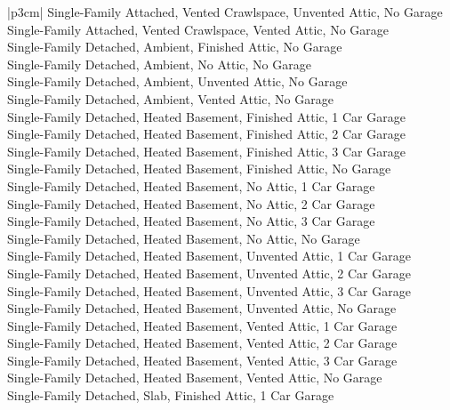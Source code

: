 \begin{customLongTable}{ |p{3cm}| }
Single-Family Attached, Vented Crawlspace, Unvented Attic, No Garage \\ \hline
Single-Family Attached, Vented Crawlspace, Vented Attic, No Garage \\ \hline
Single-Family Detached, Ambient, Finished Attic, No Garage \\ \hline
Single-Family Detached, Ambient, No Attic, No Garage \\ \hline
Single-Family Detached, Ambient, Unvented Attic, No Garage \\ \hline
Single-Family Detached, Ambient, Vented Attic, No Garage \\ \hline
Single-Family Detached, Heated Basement, Finished Attic, 1 Car Garage \\ \hline
Single-Family Detached, Heated Basement, Finished Attic, 2 Car Garage \\ \hline
Single-Family Detached, Heated Basement, Finished Attic, 3 Car Garage \\ \hline
Single-Family Detached, Heated Basement, Finished Attic, No Garage \\ \hline
Single-Family Detached, Heated Basement, No Attic, 1 Car Garage \\ \hline
Single-Family Detached, Heated Basement, No Attic, 2 Car Garage \\ \hline
Single-Family Detached, Heated Basement, No Attic, 3 Car Garage \\ \hline
Single-Family Detached, Heated Basement, No Attic, No Garage \\ \hline
Single-Family Detached, Heated Basement, Unvented Attic, 1 Car Garage \\ \hline
Single-Family Detached, Heated Basement, Unvented Attic, 2 Car Garage \\ \hline
Single-Family Detached, Heated Basement, Unvented Attic, 3 Car Garage \\ \hline
Single-Family Detached, Heated Basement, Unvented Attic, No Garage \\ \hline
Single-Family Detached, Heated Basement, Vented Attic, 1 Car Garage \\ \hline
Single-Family Detached, Heated Basement, Vented Attic, 2 Car Garage \\ \hline
Single-Family Detached, Heated Basement, Vented Attic, 3 Car Garage \\ \hline
Single-Family Detached, Heated Basement, Vented Attic, No Garage \\ \hline
Single-Family Detached, Slab, Finished Attic, 1 Car Garage \\ \hline

\end{customLongTable}
